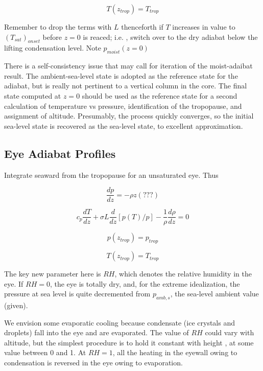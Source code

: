 \documentclass{article}
\begin{document}
\begin{equation}
	T(z_{trop} ) = T_{trop}
\end{equation}

Remember to drop the terms with $L$ thenceforth if $T$ increases in value to $(T_{sat})_{onset}$ before $z=0$ is reaced; i.e. , switch over to the dry adiabat below the lifting condensation level. Note $p_{moist}(z=0)$

There is a self-consistency issue that may call for iteration of the moist-adaibat result. The ambient-sea-level state is adopted as the reference state for the adiabat, but is really not pertinent to a vertical column in the core. The final state computed at $z=0$ should be used as the reference state for a second calculation of temperature vs pressure, identification of the tropopause, and assignment of altitude. Presumably, the process quickly converges, so the initial sea-level state is recovered as the sea-level state, to excellent approximation.

\subsection{Eye Adiabat Profiles}

Integrate seaward from the tropopause for an unsaturated eye. Thus

\begin{equation}
	\frac{dp}{dz} = - \rho z (???)
\end{equation}

\begin{equation}
	c_p \frac{dT}{dz} + \sigma L \frac{d}{dz} [ p(T) / p] - \frac{1}{\rho} \frac{d \rho}{d z} = 0
\end{equation}

\begin{equation}
	p(z_{trop}) = p_{trop} 
\end{equation}

\begin{equation}
	T(z_{trop} ) = T_{trop}
\end{equation}

The key new parameter here is $RH$, which denotes the relative humidity in the eye. If $RH=0$, the eye is totally dry, and, for the extreme idealization, the pressure at sea level is quite decremented from $p_{amb,s}$, the sea-level ambient value (given).

We envision some evaporatic cooling because condensate (ice crystals and droplets) fall into the eye and are evaporated. The value of $RH$ could vary with altitude, but the simplest procedure is to hold it constant with height , at some value between 0 and 1. At $RH=1$, all the heating in the eyewall owing to condensation is reversed in the eye owing to evaporation.
\end{document}
